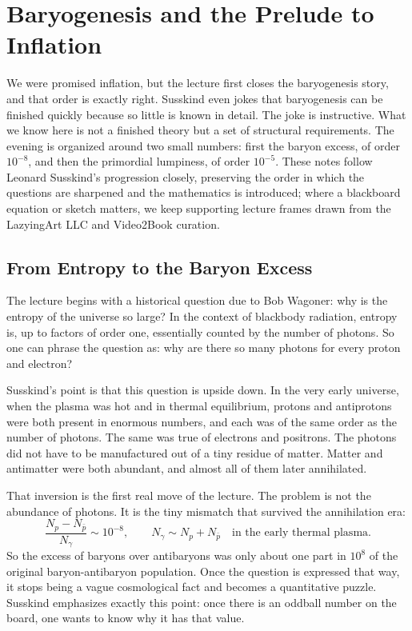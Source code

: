 \chapter{Baryogenesis and the Prelude to Inflation}

We were promised inflation, but the lecture first closes the baryogenesis story, and that order is exactly right. Susskind even jokes that baryogenesis can be finished quickly because so little is known in detail. The joke is instructive. What we know here is not a finished theory but a set of structural requirements. The evening is organized around two small numbers: first the baryon excess, of order \(10^{-8}\), and then the primordial lumpiness, of order \(10^{-5}\). These notes follow Leonard Susskind's progression closely, preserving the order in which the questions are sharpened and the mathematics is introduced; where a blackboard equation or sketch matters, we keep supporting lecture frames drawn from the LazyingArt LLC and Video2Book curation.

\section{From Entropy to the Baryon Excess}

The lecture begins with a historical question due to Bob Wagoner: why is the entropy of the universe so large? In the context of blackbody radiation, entropy is, up to factors of order one, essentially counted by the number of photons. So one can phrase the question as: why are there so many photons for every proton and electron?

Susskind's point is that this question is upside down. In the very early universe, when the plasma was hot and in thermal equilibrium, protons and antiprotons were both present in enormous numbers, and each was of the same order as the number of photons. The same was true of electrons and positrons. The photons did not have to be manufactured out of a tiny residue of matter. Matter and antimatter were both abundant, and almost all of them later annihilated.

That inversion is the first real move of the lecture. The problem is not the abundance of photons. It is the tiny mismatch that survived the annihilation era:
\begin{equation}
\frac{N_p-N_{\bar p}}{N_\gamma}\sim 10^{-8},
\qquad
N_\gamma \sim N_p+N_{\bar p}
\quad
\text{in the early thermal plasma.}
\end{equation}
So the excess of baryons over antibaryons was only about one part in \(10^8\) of the original baryon-antibaryon population.
Once the question is expressed that way, it stops being a vague cosmological fact and becomes a quantitative puzzle.
Susskind emphasizes exactly this point: once there is an oddball number on the board, one wants to know why it has that value.

